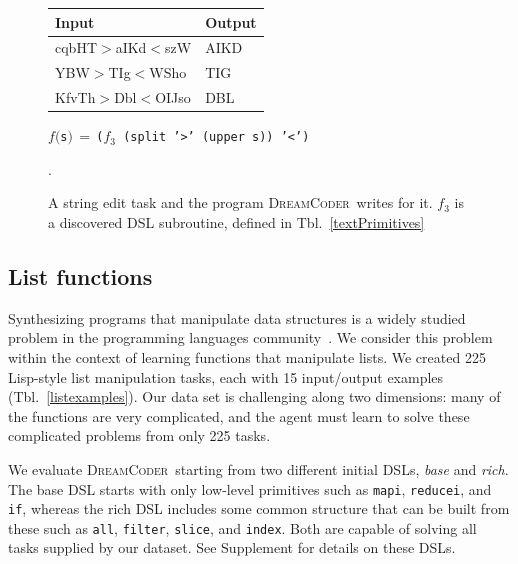 \documentclass{article}
\newcommand{\system}{\textsc{DreamCoder}~}
\newcommand{\code}[1]{{\footnotesize\texttt{#1}}}
\begin{document}
\begin{figure}
  \centering\begin{tabular}{ll}\toprule
    Input&Output\\\midrule
cqbHT$>$aIKd$<$szW& 	AIKD\\
YBW$>$TIg$<$WSho 	&TIG\\
KfvTh$>$Dbl$<$OIJso 	&DBL
    \\\bottomrule
  \end{tabular}
  
  \vspace{0.25cm}
  
  \begin{minipage}{7.5cm}
    $f($\code{s}$) \,=\, $\code{(}$f_3$\code{ (split '>' (upper s)) '<')}
  \end{minipage}
  \caption{A string edit task and the program \system writes for it. $f_3$ is a discovered DSL subroutine, defined in Tbl.~\ref{textPrimitives}}\label{exampleTextProblem}.
  \end{figure}

\subsection{List functions}
Synthesizing programs that manipulate data structures is
a widely studied problem in the programming languages community~\cite{feser2015synthesizing}.
We consider this problem within the context of
learning functions that manipulate lists.
We created 225 Lisp-style list manipulation tasks,
each with 15 input/output examples (Tbl.~\ref{listexamples}).
Our data set is challenging along two dimensions:
many of the functions are very complicated,
and the agent must learn to solve these complicated problems from only 225 tasks.


We evaluate \system starting from two different initial DSLs, \emph{base} and
\emph{rich}. The base DSL starts with only
low-level primitives such as \code{mapi}, \code{reducei}, and
\code{if}, whereas the rich DSL includes some common structure that can be
built from these such as \code{all}, \code{filter}, \code{slice}, and
\code{index}.
Both are capable of solving all tasks supplied by our dataset.
See Supplement for details on these DSLs.
\end{document}
